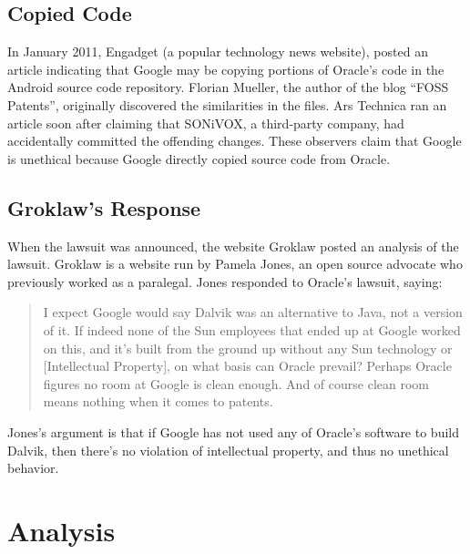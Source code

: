 \documentclass[11pt]{article}
\begin{document}
\begin{multicols}{2}

\subsection{Copied Code} %
\label{sub:fosspatents}

In January 2011, Engadget (a popular technology news website), posted an article
indicating that Google may be copying portions of Oracle's code in the Android
source code repository.  \cite{android-copies-java-code}  Florian Mueller, the
author of the blog ``FOSS Patents'', originally discovered the similarities in
the files.  \cite{fosspatents}  Ars Technica ran an article soon after claiming
that SONiVOX, a third-party company, had accidentally committed the offending
changes. \cite{ars-tech-copying} These observers claim that Google is unethical
because Google directly copied source code from Oracle.


\subsection{Groklaw's Response} %
\label{sub:args_groklaw}

When the lawsuit was announced, the website Groklaw posted an analysis of the
lawsuit.  Groklaw is a website run by Pamela Jones, an open source advocate who
previously worked as a paralegal. \cite{groklaw-pj} Jones responded to Oracle's
lawsuit, saying: \cite{groklaw}

\begin{quotation}
I expect Google would say Dalvik was an alternative to Java, not a version of
it. If indeed none of the Sun employees that ended up at Google worked on this,
and it's built from the ground up without any Sun technology or [Intellectual
Property], on what basis can Oracle prevail? Perhaps Oracle figures no room at
Google is clean enough. And of course clean room means nothing when it comes to
patents.
\end{quotation}

Jones's argument is that if Google has not used any of Oracle's software to
build Dalvik, then there's no violation of intellectual property, and thus no
unethical behavior.



\section{Analysis} %
\label{sec:analysis}


\end{multicols}
\end{document}
